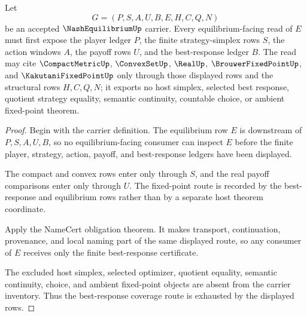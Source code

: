 \begin{theorem}
\label{thm:nash-equilibrium-best-response-coverage}
Let
$$
G=(P,S,A,U,B,E,H,C,Q,N)
$$
be an accepted $\NashEquilibriumUp$ carrier. Every equilibrium-facing read of $E$ must first expose the player ledger $P$, the finite strategy-simplex rows $S$, the action windows $A$, the payoff rows $U$, and the best-response ledger $B$. The read may cite $\CompactMetricUp$, $\ConvexSetUp$, $\RealUp$, $\BrouwerFixedPointUp$, and $\KakutaniFixedPointUp$ only through those displayed rows and the structural rows $H,C,Q,N$; it exports no host simplex, selected best response, quotient strategy equality, semantic continuity, countable choice, or ambient fixed-point theorem.
\end{theorem}
\begin{proof}
Begin with the carrier definition. The equilibrium row $E$ is downstream of $P,S,A,U,B$, so no equilibrium-facing consumer can inspect $E$ before the finite player, strategy, action, payoff, and best-response ledgers have been displayed.

The compact and convex rows enter only through $S$, and the real payoff comparisons enter only through $U$. The fixed-point route is recorded by the best-response and equilibrium rows rather than by a separate host theorem coordinate.

Apply the NameCert obligation theorem. It makes transport, continuation, provenance, and local naming part of the same displayed route, so any consumer of $E$ receives only the finite best-response certificate.

The excluded host simplex, selected optimizer, quotient equality, semantic continuity, choice, and ambient fixed-point objects are absent from the carrier inventory. Thus the best-response coverage route is exhausted by the displayed rows.
\end{proof}


